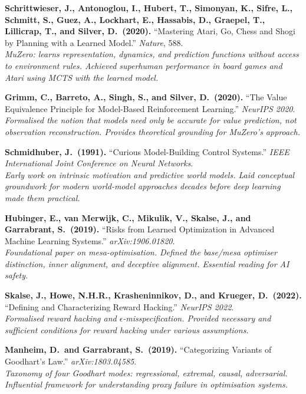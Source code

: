\documentclass[11pt,a4paper]{article}
\theoremstyle{definition}
\begin{document}
\begin{enumerate}[label={[\arabic*]},leftmargin=2em]
\item \textbf{Schrittwieser, J., Antonoglou, I., Hubert, T.,
  Simonyan, K., Sifre, L., Schmitt, S., Guez, A., Lockhart, E.,
  Hassabis, D., Graepel, T., Lillicrap, T., and Silver, D.\ (2020).}
  ``Mastering Atari, Go, Chess and Shogi by Planning with a Learned Model.''
  \textit{Nature}, 588.\\
  \textit{MuZero: learns representation, dynamics, and prediction functions
  without access to environment rules. Achieved superhuman performance
  in board games and Atari using MCTS with the learned model.}

\item \textbf{Grimm, C., Barreto, A., Singh, S., and Silver, D.\ (2020).}
  ``The Value Equivalence Principle for Model-Based Reinforcement Learning.''
  \textit{NeurIPS 2020}.\\
  \textit{Formalised the notion that models need only be accurate for value
  prediction, not observation reconstruction. Provides theoretical
  grounding for MuZero's approach.}

\item \textbf{Schmidhuber, J.\ (1991).}
  ``Curious Model-Building Control Systems.''
  \textit{IEEE International Joint Conference on Neural Networks}.\\
  \textit{Early work on intrinsic motivation and predictive world models.
  Laid conceptual groundwork for modern world-model approaches decades
  before deep learning made them practical.}

\item \textbf{Hubinger, E., van Merwijk, C., Mikulik, V., Skalse, J.,
  and Garrabrant, S.\ (2019).}
  ``Risks from Learned Optimization in Advanced Machine Learning Systems.''
  \textit{arXiv:1906.01820}.\\
  \textit{Foundational paper on mesa-optimisation. Defined the base/mesa
  optimiser distinction, inner alignment, and deceptive alignment.
  Essential reading for AI safety.}

\item \textbf{Skalse, J., Howe, N.H.R., Krasheninnikov, D., and
  Krueger, D.\ (2022).}
  ``Defining and Characterizing Reward Hacking.''
  \textit{NeurIPS 2022}.\\
  \textit{Formalised reward hacking and $\epsilon$-misspecification.
  Provided necessary and sufficient conditions for reward hacking
  under various assumptions.}

\item \textbf{Manheim, D.\ and Garrabrant, S.\ (2019).}
  ``Categorizing Variants of Goodhart's Law.''
  \textit{arXiv:1803.04585}.\\
  \textit{Taxonomy of four Goodhart modes: regressional, extremal, causal,
  adversarial. Influential framework for understanding proxy failure
  in optimisation systems.}


\end{enumerate}
\end{document}
